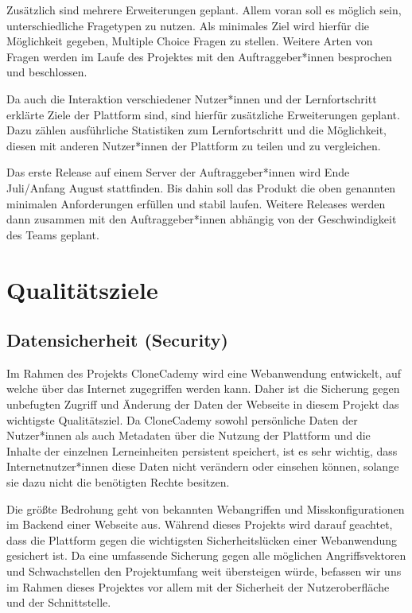 \documentclass[accentcolor=tud0b,12pt,paper=a4]{tudreport}
\begin{document}
Zusätzlich sind mehrere Erweiterungen geplant. Allem voran soll es möglich sein, unterschiedliche Fragetypen zu nutzen. Als minimales Ziel wird hierfür die Möglichkeit gegeben, Multiple Choice Fragen zu stellen. Weitere Arten von Fragen werden im Laufe des Projektes mit den Auftraggeber*innen besprochen und beschlossen.

Da auch die Interaktion verschiedener Nutzer*innen und der Lernfortschritt erklärte Ziele der Plattform sind, sind hierfür zusätzliche Erweiterungen geplant. Dazu zählen ausführliche Statistiken zum Lernfortschritt und die Möglichkeit, diesen mit anderen Nutzer*innen der Plattform zu teilen und zu vergleichen.

Das erste Release auf einem Server der Auftraggeber*innen wird Ende Juli/Anfang August stattfinden. Bis dahin soll das Produkt die oben genannten minimalen Anforderungen erfüllen und stabil laufen. Weitere Releases werden dann zusammen mit den Auftraggeber*innen abhängig von der Geschwindigkeit des Teams geplant.


\chapter{Qualitätsziele}
\section{Datensicherheit (Security)}

Im Rahmen des Projekts CloneCademy wird eine Webanwendung entwickelt, auf welche über das Internet zugegriffen werden kann. Daher ist die Sicherung gegen unbefugten Zugriff und Änderung der Daten der Webseite in diesem Projekt das wichtigste Qualitätsziel. Da CloneCademy sowohl persönliche Daten der Nutzer*innen als auch Metadaten über die Nutzung der Plattform und die Inhalte der einzelnen Lerneinheiten persistent speichert, ist es sehr wichtig, dass Internetnutzer*innen diese Daten nicht verändern oder einsehen können, solange sie dazu nicht die benötigten Rechte besitzen.

Die größte Bedrohung geht von bekannten Webangriffen und Misskonfigurationen im Backend einer Webseite aus. Während dieses Projekts wird darauf geachtet, dass die Plattform gegen die wichtigsten Sicherheitslücken einer Webanwendung gesichert ist. Da eine umfassende Sicherung gegen alle möglichen Angriffsvektoren und Schwachstellen den Projektumfang weit übersteigen würde, befassen wir uns im Rahmen dieses Projektes vor allem mit der Sicherheit der Nutzeroberfläche und der Schnittstelle.
\end{document}
